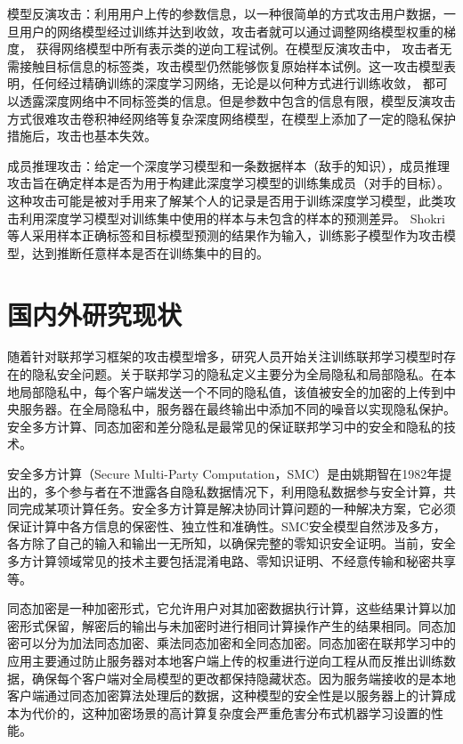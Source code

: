 模型反演攻击：利用用户上传的参数信息，以一种很简单的方式攻击用户数据，一旦用户的网络模型经过训练并达到收敛，攻击者就可以通过调整网络模型权重的梯度， 获得网络模型中所有表示类的逆向工程试例。在模型反演攻击中， 攻击者无需接触目标信息的标签类，攻击模型仍然能够恢复原始样本试例。这一攻击模型表明，任何经过精确训练的深度学习网络，无论是以何种方式进行训练收敛， 都可以透露深度网络中不同标签类的信息。但是参数中包含的信息有限，模型反演攻击方式很难攻击卷积神经网络等复杂深度网络模型，在模型上添加了一定的隐私保护措施后，攻击也基本失效。

成员推理攻击：给定一个深度学习模型和一条数据样本（敌手的知识），成员推理攻击旨在确定样本是否为用于构建此深度学习模型的训练集成员（对手的目标）。这种攻击可能是被对手用来了解某个人的记录是否用于训练深度学习模型，此类攻击利用深度学习模型对训练集中使用的样本与未包含的样本的预测差异。 Shokri 等人采用样本正确标签和目标模型预测的结果作为输入，训练影子模型作为攻击模型，达到推断任意样本是否在训练集中的目的。

\section{国内外研究现状}
随着针对联邦学习框架的攻击模型增多，研究人员开始关注训练联邦学习模型时存在的隐私安全问题。关于联邦学习的隐私定义主要分为全局隐私和局部隐私。在本地局部隐私中，每个客户端发送一个不同的隐私值，该值被安全的加密的上传到中央服务器。在全局隐私中，服务器在最终输出中添加不同的噪音以实现隐私保护。安全多方计算、同态加密和差分隐私是最常见的保证联邦学习中的安全和隐私的技术。

安全多方计算（Secure Multi-Party Computation，SMC）是由姚期智在1982年提出的，多个参与者在不泄露各自隐私数据情况下，利用隐私数据参与安全计算，共同完成某项计算任务。安全多方计算是解决协同计算问题的一种解决方案，它必须保证计算中各方信息的保密性、独立性和准确性。SMC安全模型自然涉及多方，各方除了自己的输入和输出一无所知，以确保完整的零知识安全证明。当前，安全多方计算领域常见的技术主要包括混淆电路、零知识证明、不经意传输和秘密共享等。

同态加密是一种加密形式，它允许用户对其加密数据执行计算，这些结果计算以加密形式保留，解密后的输出与未加密时进行相同计算操作产生的结果相同。同态加密可以分为加法同态加密、乘法同态加密和全同态加密。同态加密在联邦学习中的应用主要通过防止服务器对本地客户端上传的权重进行逆向工程从而反推出训练数据，确保每个客户端对全局模型的更改都保持隐藏状态。因为服务端接收的是本地客户端通过同态加密算法处理后的数据，这种模型的安全性是以服务器上的计算成本为代价的，这种加密场景的高计算复杂度会严重危害分布式机器学习设置的性能。

